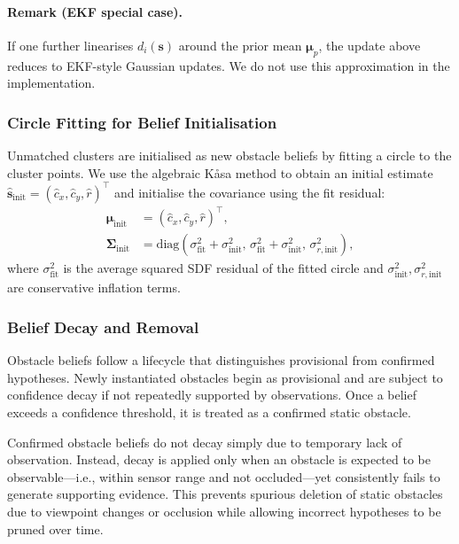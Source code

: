 \documentclass[a4paper, twoside]{article}
\begin{document}
\paragraph{Remark (EKF special case).}
If one further linearises $d_i(\mathbf{s})$ around the prior mean $\boldsymbol{\mu}_p$, the update above reduces
to EKF-style Gaussian updates. We do not use this approximation in the implementation.

\subsubsection{Circle Fitting for Belief Initialisation}
\label{sec:circle_fit}

Unmatched clusters are initialised as new obstacle beliefs by fitting a circle to the cluster points.
We use the algebraic K{\aa}sa method \cite{kasa1976} to obtain an initial estimate
$\hat{\mathbf{s}}_{\text{init}}=(\hat{c}_x,\hat{c}_y,\hat{r})^\top$ and initialise the covariance using the fit residual:
\begin{align}
\boldsymbol{\mu}_{\text{init}} &= (\hat{c}_x,\hat{c}_y,\hat{r})^\top,\\
\boldsymbol{\Sigma}_{\text{init}} &= \mathrm{diag}(\sigma^2_{\text{fit}}+\sigma^2_{\text{init}},\,
\sigma^2_{\text{fit}}+\sigma^2_{\text{init}},\,\sigma^2_{r,\text{init}}),
\end{align}
where $\sigma^2_{\text{fit}}$ is the average squared SDF residual of the fitted circle and
$\sigma^2_{\text{init}},\sigma^2_{r,\text{init}}$ are conservative inflation terms.

\subsubsection{Belief Decay and Removal}
\label{sec:belief_decay}

Obstacle beliefs follow a lifecycle that distinguishes provisional from confirmed hypotheses. Newly instantiated obstacles begin as provisional and are subject to confidence decay if not repeatedly supported by observations. Once a belief exceeds a confidence threshold, it is treated as a confirmed static obstacle.

Confirmed obstacle beliefs do not decay simply due to temporary lack of observation. Instead, decay is applied only when an obstacle is expected to be observable—i.e., within sensor range and not occluded—yet consistently fails to generate supporting evidence. This prevents spurious deletion of static obstacles due to viewpoint changes or occlusion while allowing incorrect hypotheses to be pruned over time.
\end{document}
